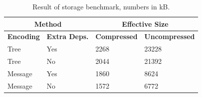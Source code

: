 \begin{table}
    \centering
    \begin{tabular}{|l|l|l|l|}
        \hline
        \multicolumn{2}{|c|}{\textbf{Method}} & \multicolumn{2}{|c|}{\textbf{Effective Size}} \\ \hline
        \textbf{Encoding} & \textbf{Extra Deps.} & \textbf{Compressed} & \textbf{Uncompressed} \\ \hline
        Tree              & Yes                               & 2268                & 23228                 \\ \hline
        Tree              & No                                & 2044                & 21392                \\ \hline
        Message           & Yes                               & 1860                & 8624                 \\ \hline
        Message           & No                                & 1572                & 6772                 \\ \hline
    \end{tabular}
    \caption{Result of storage benchmark, numbers in kB.}
    \label{tab:storage-res}
\end{table}
